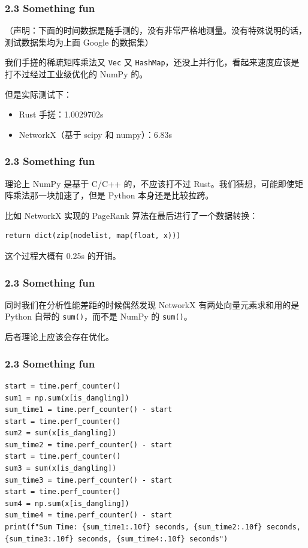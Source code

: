 \documentclass{beamer}
\begin{document}
\begin{frame}
	\frametitle{2.3 Something fun}
	（声明：下面的时间数据是随手测的，没有非常严格地测量。没有特殊说明的话，测试数据集均为上面 Google 的数据集）

	\pause

	我们手搓的稀疏矩阵乘法又 \texttt{Vec} 又 \texttt{HashMap}，还没上并行化，看起来速度应该是打不过经过工业级优化的 NumPy 的。
	
	\pause

	但是实际测试下：
	\begin{itemize}
		\item Rust 手搓：1.0029702s
		\item NetworkX（基于 scipy 和 numpy）：6.83s
	\end{itemize}

\end{frame}

\begin{frame}[fragile]
	\frametitle{2.3 Something fun}
	理论上 NumPy 是基于 C/C++ 的，不应该打不过 Rust。我们猜想，可能即使矩阵乘法那一块加速了，但是 Python 本身还是比较拉跨。
	
	\pause
	
	比如 NetworkX 实现的 PageRank 算法在最后进行了一个数据转换：

\begin{lstlisting}
return dict(zip(nodelist, map(float, x)))
\end{lstlisting}

	\pause

	这个过程大概有 0.25s 的开销。

\end{frame}

\begin{frame}
	\frametitle{2.3 Something fun}
	同时我们在分析性能差距的时候偶然发现 NetworkX 有两处向量元素求和用的是 Python 自带的 \texttt{sum()}，而不是 NumPy 的 \texttt{sum()}。
	
	\pause
	
	后者理论上应该会存在优化。
\end{frame}

\begin{frame}[fragile]
	\frametitle{2.3 Something fun}
\begin{lstlisting}
start = time.perf_counter()
sum1 = np.sum(x[is_dangling])
sum_time1 = time.perf_counter() - start
start = time.perf_counter()
sum2 = sum(x[is_dangling])
sum_time2 = time.perf_counter() - start
start = time.perf_counter()
sum3 = sum(x[is_dangling])
sum_time3 = time.perf_counter() - start
start = time.perf_counter()
sum4 = np.sum(x[is_dangling])
sum_time4 = time.perf_counter() - start
print(f"Sum Time: {sum_time1:.10f} seconds, {sum_time2:.10f} seconds, {sum_time3:.10f} seconds, {sum_time4:.10f} seconds")
\end{lstlisting}
\end{frame}
\end{document}
